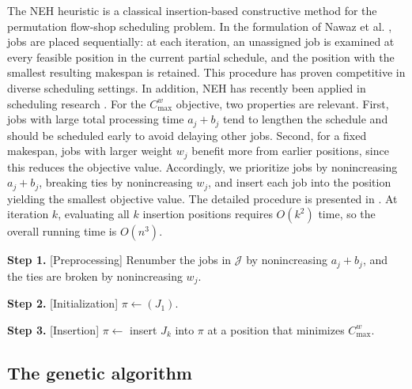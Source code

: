 \documentclass[12pt]{article}
\begin{document}
\begin{sloppypar}
        The NEH heuristic is a classical insertion-based constructive method for the permutation flow-shop scheduling problem. In the formulation of Nawaz et al. \cite{NawazEnscoreHam1983Omega}, jobs are placed sequentially: at each iteration, an unassigned job is examined at every feasible position in the current partial schedule, and the position with the smallest resulting makespan is retained. This procedure has proven competitive in diverse scheduling settings. In addition, NEH has recently been applied in scheduling research \citep{PukaSkalnaIwona2024COR}. For the $C_{\max}^w$ objective, two properties are relevant. First, jobs with large total processing time $a_j+b_j$ tend to lengthen the schedule and should be scheduled early to avoid delaying other jobs. Second, for a fixed makespan, jobs with larger weight $w_j$ benefit more from earlier positions, since this reduces the objective value. Accordingly, we prioritize jobs by nonincreasing $a_j+b_j$, breaking ties by nonincreasing $w_j$, and insert each job into the position yielding the smallest objective value. The detailed procedure is presented in . At iteration $k$, evaluating all $k$ insertion positions requires $O(k^2)$ time, so the overall running time is $O(n^3)$.
        
        \begin{algorithm}[H]
            \small
            \linespread{1.2}\selectfont
            \SetAlgoLined
            \DontPrintSemicolon
            \caption{NEH heuristic for $F2 \mid \mid C_{\max}^w$}\label{Alg-NEH}
            \BlankLine
            \textbf{Step 1.} [Preprocessing] Renumber the jobs in $\mathcal{J}$ by nonincreasing $a_j+b_j$, and the ties are broken by nonincreasing $w_j$.  \;
            
            \textbf{Step 2.} [Initialization] $\pi \gets (J_{1})$. \;
            
            \textbf{Step 3.} [Insertion] 
            {
                $\pi \gets$ insert $J_{k}$ into $\pi$ at a position that minimizes $C_{\max}^w$. \;
            }
        \end{algorithm}
        
        \subsection{The genetic algorithm}  \label{Subset:GA}
        

\end{sloppypar}
\end{document}
